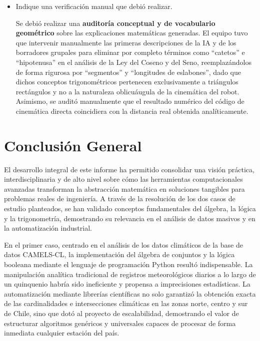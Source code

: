 \documentclass[12pt]{article}
\begin{document}
\begin{itemize}
	\item[e)] Indique una verificación manual que debió realizar.
	
	Se debió realizar una \textbf{auditoría conceptual y de vocabulario geométrico} sobre las explicaciones matemáticas generadas. El equipo tuvo que intervenir manualmente las primeras descripciones de la IA y de los borradores grupales para eliminar por completo términos como ``catetos'' e ``hipotenusa'' en el análisis de la Ley del Coseno y del Seno, reemplazándolos de forma rigurosa por ``segmentos'' y ``longitudes de eslabones'', dado que dichos conceptos trigonométricos pertenecen exclusivamente a triángulos rectángulos y no a la naturaleza oblicuáugula de la cinemática del robot. Asimismo, se auditó manualmente que el resultado numérico del código de cinemática directa coincidiera con la distancia real obtenida analíticamente.

\end{itemize}


\newpage
\section{Conclusión General}

El desarrollo integral de este informe ha permitido consolidar una visión práctica, interdisciplinaria y de alto nivel sobre cómo las herramientas computacionales avanzadas transforman la abstracción matemática en soluciones tangibles para problemas reales de ingeniería. A través de la resolución de los dos casos de estudio planteados, se han validado conceptos fundamentales del álgebra, la lógica y la trigonometría, demostrando su relevancia en el análisis de datos masivos y en la automatización industrial.

En el primer caso, centrado en el análisis de los datos climáticos de la base de datos CAMELS-CL, la implementación del álgebra de conjuntos y la lógica booleana mediante el lenguaje de programación Python resultó indispensable. La manipulación analítica tradicional de registros meteorológicos diarios a lo largo de un quinquenio habría sido ineficiente y propensa a imprecisiones estadísticas. La automatización mediante librerías científicas no solo garantizó la obtención exacta de las cardinalidades e intersecciones climáticas en las zonas norte, centro y sur de Chile, sino que dotó al proyecto de escalabilidad, demostrando el valor de estructurar algoritmos genéricos y universales capaces de procesar de forma inmediata cualquier estación del país.
\end{document}
